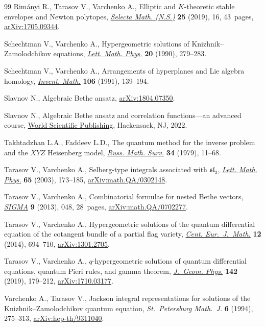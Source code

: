 \begin{thebibliography}{99}
Rim\'anyi R., Tarasov V., Varchenko A., Elliptic and {$K$}-theoretic stable
 envelopes and {N}ewton polytopes,
 \href{https://doi.org/10.1007/s00029-019-0451-5}{\textit{Selecta Math.
 (N.S.)}} \textbf{25} (2019), 16, 43~pages,
 \href{http://arxiv.org/abs/1705.09344}{arXiv:1705.09344}.

Schechtman V., Varchenko A., Hypergeometric solutions of
 {K}nizhnik--{Z}amolodchikov equations,
 \href{https://doi.org/10.1007/BF00626523}{\textit{Lett. Math. Phys.}}
 \textbf{20} (1990), 279--283.

Schechtman V., Varchenko A., Arrangements of hyperplanes and {L}ie algebra
 homology, \href{https://doi.org/10.1007/BF01243909}{\textit{Invent. Math.}}
 \textbf{106} (1991), 139--194.

Slavnov N., Algebraic {B}ethe ansatz,
 \href{http://arxiv.org/abs/1804.07350}{arXiv:1804.07350}.

Slavnov N., Algebraic {B}ethe ansatz and correlation functions---an advanced
 course, \href{https://doi.org/10.1142/12776}{World Scientific Publishing},
 Hackensack, NJ, 2022.

Takhtadzhan L.A., Faddeev L.D., The quantum method for the inverse problem and
 the {$XYZ$} {H}eisenberg model,
 \href{https://doi.org/10.1070/RM1979v034n05ABEH003909}{\textit{Russ. Math.
 Surv.}} \textbf{34} (1979), 11--68.

Tarasov V., Varchenko A., Selberg-type integrals associated with
 {$\mathfrak{sl}_3$},
 \href{https://doi.org/10.1023/B:MATH.0000010712.67685.9d}{\textit{Lett. Math.
 Phys.}} \textbf{65} (2003), 173--185,
 \href{http://arxiv.org/abs/math.QA/0302148}{arXiv:math.QA/0302148}.

Tarasov V., Varchenko A., Combinatorial formulae for nested {B}ethe vectors,
 \href{https://doi.org/10.3842/SIGMA.2013.048}{\textit{SIGMA}} \textbf{9}
 (2013), 048, 28~pages,
 \href{http://arxiv.org/abs/math.QA/0702277}{arXiv:math.QA/0702277}.

Tarasov V., Varchenko A., Hypergeometric solutions of the quantum differential
 equation of the cotangent bundle of a partial flag variety,
 \href{https://doi.org/10.2478/s11533-013-0376-8}{\textit{Cent.
 Eur.~J.~Math.}} \textbf{12} (2014), 694--710,
 \href{http://arxiv.org/abs/1301.2705}{arXiv:1301.2705}.

Tarasov V., Varchenko A., {$q$}-hypergeometric solutions of quantum
 differential equations, quantum {P}ieri rules, and gamma theorem,
 \href{https://doi.org/10.1016/j.geomphys.2019.04.005}{\textit{J.~Geom.
 Phys.}} \textbf{142} (2019), 179--212,
 \href{http://arxiv.org/abs/1710.03177}{arXiv:1710.03177}.

Varchenko A., Tarasov V., Jackson integral representations for solutions of the
 {K}nizhnik--{Z}amolodchikov quantum equation, \textit{St.~Petersburg
 Math.~J.} \textbf{6} (1994), 275--313,
 \href{http://arxiv.org/abs/hep-th/9311040}{arXiv:hep-th/9311040}.

\end{thebibliography}
